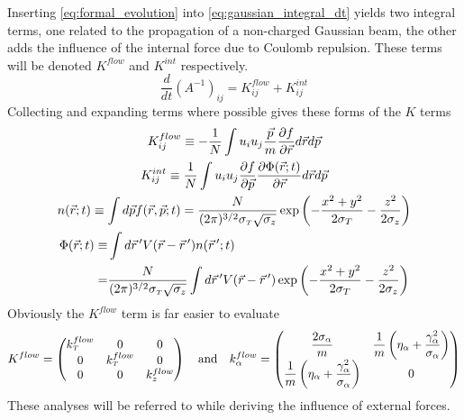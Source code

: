 Inserting \ref{eq:formal_evolution} into \ref{eq:gaussian_integral_dt} yields two integral terms, one related to the propagation of a non-charged Gaussian beam, the other adds the influence of the internal force due to Coulomb repulsion.
These terms will be denoted $K^{flow}$ and $K^{int}$ respectively.
\begin{equation} \label{eq:gaussian_integral_dt}
  \frac{d}{dt}(A^{-1})_{ij} = K^{flow}_{ij} + K^{int}_{ij}
\end{equation}
Collecting and expanding terms where possible gives these forms of the $K$ terms
\begin{gather}
  K^{flow}_{ij} \equiv -\frac{1}{N} \int u_i u_j \frac{\vec{p}}{m} \frac{\partial f}{\partial \vec{r}} d\vec{r} d\vec{p} \\
  K^{int}_{ij} \equiv \frac{1}{N} \int u_i u_j \frac{\partial f}{\partial \vec{p}} \frac{\partial \Phi(\vec{r};t)}{\partial \vec{r}} d\vec{r} d\vec{p} \\
  n(\vec{r};t) \equiv \int d\vec{p} f(\vec{r},\vec{p};t) 
    = \frac{N}{(2\pi)^{3/2} \sigma_{{\scriptscriptstyle T}} \sqrt{\sigma_{z}}} \exp \left( -\frac{x^2+y^2}{2\sigma_{T}} - \frac{z^2}{2\sigma_{z}} \right) \\
  \begin{split}
    \Phi(\vec{r};t) \equiv & \int d\vec{r}\,^{\prime} V(\vec{r} - \vec{r}\,^{\prime}) n(\vec{r}\,^{\prime}; t) \\
    = & \frac{N}{(2\pi)^{3/2} \sigma_{{\scriptscriptstyle T}} \sqrt{\sigma_{z}}} \int d\vec{r}\,^{\prime} V(\vec{r} - \vec{r}\,^{\prime}) \exp \left( -\frac{x^2+y^2}{2\sigma_{T}} - \frac{z^2}{2\sigma_{z}} \right)
  \end{split}
\end{gather}
Obviously the $K^{flow}$ term is far easier to evaluate
\begin{equation}
  K^{flow} = 
  \begin{pmatrix}
    k^{flow}_{{\scriptscriptstyle T}} & 0 & 0 \\
    0 & k^{flow}_{{\scriptscriptstyle T}} & 0 \\
    0 & 0 & k^{flow}_{z}
  \end{pmatrix}
  \quad \text{and} \quad
  k^{flow}_{\alpha} = 
  \begin{pmatrix}
    \dfrac{2\sigma_{\alpha}}{m} & \dfrac{1}{m} \left(\eta_{\alpha} + \dfrac{\gamma_{\alpha}^2}{\sigma_{\alpha}} \right) \\
    \dfrac{1}{m} \left(\eta_{\alpha} + \dfrac{\gamma_{\alpha}^2}{\sigma_{\alpha}} \right) & 0
  \end{pmatrix}
\end{equation}
These analyses will be referred to while deriving the influence of external forces.

